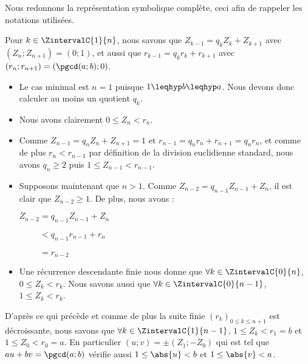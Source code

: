 Nous redonnons la représentation symbolique complète, ceci afin de rappeler les notations utilisées. 



\medskip


Pour $k \in \ZintervalC{1}{n}$, nous savons que $Z_{k-1} = q_k Z_k + Z_{k+1}$ avec $(Z_{n} ; Z_{n+1}) = (0 ; 1)$, et aussi que $r_{k-1} = q_k r_k + r_{k+1}$ avec $(r_{n} ; r_{n+1}) = (\pgcd(a;b) ; 0)$.


\vspace{-.25em}
\begin{itemize}[label = \small\textbullet]
	\item Le cas minimal est $n = 1$ puisque $1 \leqhyp b \leqhyp a$.
	Nous devons donc calculer au moins un quotient $q_k$.


	\item Nous avons clairement $0 \leq Z_n < r_n$.


	\item
	Comme $Z_{n-1} = q_n Z_n + Z_{n+1} = 1$ et $r_{n-1} = q_n r_n + r_{n+1} = q_n r_n$, et comme de plus $r_n < r_{n-1}$ par définition de la division euclidienne standard, nous avons $q_n \geq 2$ puis $1 \leq Z_{n-1} < r_{n-1}$.
	
	\item Supposons maintenant que $n > 1$. Comme $Z_{n-2} = q_{n-1} Z_{n-1} + Z_{n}$, il est clair que $Z_{n-2} \geq 1$.
	De plus, nous avons :
	
	\smallskip
	
	\noindent
	$Z_{n-2}
	 = q_{n-1} Z_{n-1} + Z_{n}$

	\noindent
	$\phantom{Z_{n-2}}
	 < q_{n-1} r_{n-1} + r_n$

	\noindent
	$\phantom{Z_{n-2}}
	 = r_{n-2}$
	 
	
	\item Une récurrence descendante finie nous donne que $\forall k \in \ZintervalC{0}{n}$, $0 \leq Z_k < r_k$.
	Nous savons aussi que $\forall k \in \ZintervalC{0}{n-1}$, $1 \leq Z_k < r_k$.
\end{itemize}


\medskip


D'après ce qui précède et comme de plus la suite finie $(r_k)_{0 \leq k \leq n+1}$ est décroissante, nous savons que $\forall k \in \ZintervalC{1}{n-1}$, $1 \leq Z_k < r_1 = b$ et $1 \leq Z_0 < r_0 = a$.
En particulier $(u ; v) = \pm (Z_1 ; -Z_0)$ qui est tel que $au + bv = \pgcd(a;b)$ vérifie aussi $1 \leq \abs{u} < b$ et $1 \leq \abs{v} < a$.


